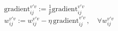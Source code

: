 \begin{frame}
{{            }
			$\text{gradient}_{ij}^{v'v} := \frac{1}{p} \text{gradient}_{ij}^{v'v}$\\
			 $w_{ij}^{v'v} := w_{ij}^{v'v} - \eta
					\, \text{gradient}_{ij}^{v'v} 
					\,, \quad \forall w_{ij}^{v'v}	$
					\vspace{-1.5mm}
		}
\end{frame}


